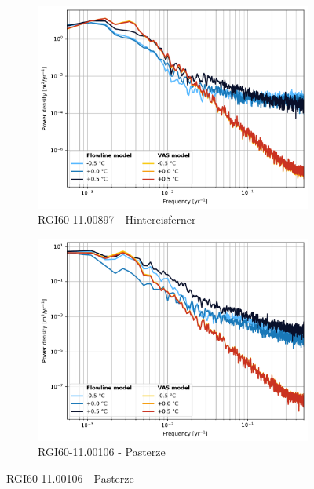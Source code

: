       \begin{figure}[htp]
        \centering
        \begin{subfigure}[b]{0.48\textwidth}
          \caption{RGI60-11.00897 - Hintereisferner}
          \label{fig:psd:hintereisferner}
          \centering
          \includegraphics[width=\textwidth]{../plots/final_plots/psd/Hintereisferner_norm.pdf}
        \end{subfigure}
        \hfill
        \begin{subfigure}[b]{0.48\textwidth}
          \caption{RGI60-11.00106 - Pasterze}
          \label{fig:psd:pasterze}
          \centering
          \includegraphics[width=\textwidth]{../plots/final_plots/psd/Pasterze_norm.pdf}
        \end{subfigure}

\end{figure}
